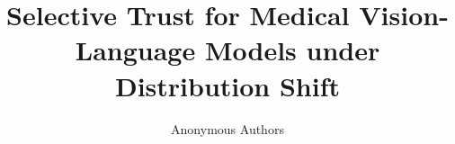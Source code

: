 \documentclass[11pt]{article}
\title{Selective Trust for Medical Vision-Language Models under Distribution Shift}
\author{Anonymous Authors}
\date{}
\begin{document}
\maketitle

\begin{abstract}

\end{abstract}









\FloatBarrier


\end{document}
